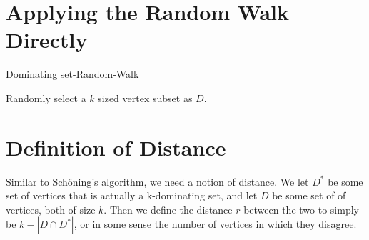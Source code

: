 \documentclass{article}
\begin{document}
\section{Applying the Random Walk Directly}
	\begin{algorithm}[H]
	\caption{Dominating set-Random-Walk}
	\DontPrintSemicolon
	\BlankLine
	Randomly select a $k$ sized vertex subset as $D$.\\
	\hspace{7em}
\end{algorithm}
	
\section{Definition of Distance}
	Similar to Sch\"{o}ning's algorithm, we need a notion of distance. We let $D^*$ be some set of vertices that is actually a k-dominating set, and let $D$ be some set of of vertices, both of size $k$. Then we define the distance $r$ between the two to simply be $k - |D \cap D^*|$, or in some sense the number of vertices in which they disagree.\par
\end{document}
